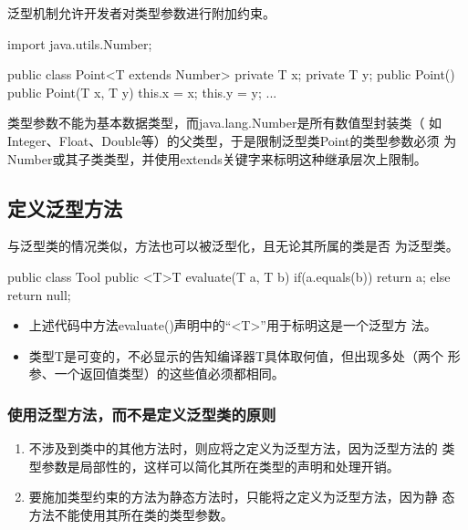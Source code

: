 泛型机制允许开发者对类型参数进行附加约束。

\begin{javaCode}
  import java.utils.Number;

  public class Point<T extends Number> {
    private T x;
    private T y;
    public Point() {}
    public Point(T x, T y) {
      this.x = x;
      this.y = y;
    }
    ...
  }
\end{javaCode}

类型参数不能为基本数据类型，而java.lang.Number是所有数值型封装类（
如Integer、Float、Double等）的父类型，于是限制泛型类Point的类型参数必须
为Number或其子类类型，并使用extends关键字来标明这种继承层次上限制。


\subsection{定义泛型方法}

与泛型类的情况类似，{\Red\hei 方法也可以被泛型化，且无论其所属的类是否
  为泛型类。}


\begin{javaCode}
  public class Tool {
    public <T>T evaluate(T a, T b) {
      if(a.equals(b)) 
      return a;
      else
      return null;
    }
  }  
\end{javaCode}


\begin{itemize}
\item 上述代码中方法evaluate()声明中的“<T>”用于标明这是一个{\hei 泛型方
    法}。
\item 类型T是可变的，不必显示的告知编译器T具体取何值，但出现多处（两个
  形参、一个返回值类型）的这些值必须都相同。
\end{itemize}



\subsubsection{使用泛型方法，而不是定义泛型类的原则}

\begin{enumerate}
\item 不涉及到类中的其他方法时，则应将之定义为泛型方法，因为泛型方法的
  类型参数是局部性的，这样可以简化其所在类型的声明和处理开销。
\item 要施加类型约束的方法为静态方法时，只能将之定义为泛型方法，因为静
  态方法不能使用其所在类的类型参数。
\end{enumerate}


